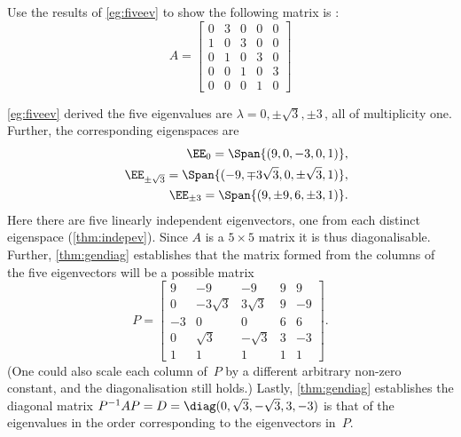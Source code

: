 \begin{example} \label{eg:fiveevp}
Use the results of \autoref{eg:fiveev} to show the following matrix is :
\begin{equation*}
A=\begin{bmatrix}0&3&0&0&0
\\1&0&3&0&0
\\0&1&0&3&0
\\0&0&1&0&3
\\0&0&0&1&0\end{bmatrix}
\end{equation*}
\begin{solution} 
\autoref{eg:fiveev} derived the five eigenvalues are  \(\lambda=0,\pm\sqrt3,\pm3\)\,, all of multiplicity one.
Further, the corresponding eigenspaces are
\begin{eqnarray*}
&&\EE_0=\Span\{(9,0,-3,0,1)\},
\\&&\EE_{\pm\sqrt3}=\Span\{(-9,\mp3\sqrt3,0,\pm\sqrt3,1)\},
\\&&\EE_{\pm3}=\Span\{(9,\pm9,6,\pm3,1)\}.
\end{eqnarray*}
Here there are five linearly independent eigenvectors, one from each distinct eigenspace  (\autoref{thm:indepev}).
Since \(A\) is a \(5\times5\) matrix it is thus diagonalisable.
Further, \autoref{thm:gendiag} establishes that the matrix formed from the columns of the five eigenvectors will be a possible matrix
\begin{equation*}
P=\begin{bmatrix} 9&-9&-9&9&9
\\0&-3\sqrt3&3\sqrt3&9&-9
\\-3&0&0&6&6
\\0&\sqrt3&-\sqrt3&3&-3
\\1&1&1&1&1
\end{bmatrix}.
\end{equation*}
(One could also scale each column of~\(P\) by a different arbitrary non-zero constant, and the diagonalisation still holds.)
Lastly, \autoref{thm:gendiag} establishes the diagonal matrix
\(P^{-1}AP=D=\diag(0,\sqrt3,-\sqrt3,3,-3)\) is that of the eigenvalues in the order corresponding to the eigenvectors in~\(P\).
\end{solution}
\end{example}





